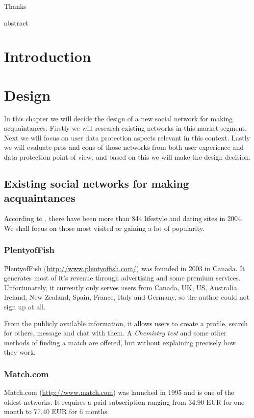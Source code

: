 \documentclass[12pt,oneside]{fithesis}
\begin{document}
\FrontMatter
\ThesisTitlePage

\begin{ThesisDeclaration}
\DeclarationText
\AdvisorName
\end{ThesisDeclaration}

\begin{ThesisThanks}
Thanks
\end{ThesisThanks}

abstract

\MainMatter
\tableofcontents
\chapter*{Introduction}
	
\chapter{Design}
	In this chapter we will decide the design of a new social network for making acquaintances. Firstly we will research existing networks in this market segment. Next we will focus on user data protection aspects relevant in this context. Lastly we will evaluate pros and cons of those networks from both user experience and data protection point of view, and  based on this we will make the design decision. 
\section{Existing social networks for making acquaintances}
	According to \cite{wiki:od}, there have been more than 844 lifestyle and dating sites in 2004. We shall focus on those most visited or gaining a lot of popularity.
	\subsection{PlentyofFish}
		PlentyofFish (\url{http://www.plentyoffish.com/}) was founded in 2003 in Canada. It generates most of it's revenue through advertising and some premium services. Unfortunately, it currently only serves users from Canada, UK, US, Australia, Ireland, New Zealand, Spain, France, Italy and Germany, so the author could not sign up at all.
		
		From the publicly available information, it allows users to create a profile, search for others, message and chat with them. A \emph{Chemistry test} and some other methods of finding a match are offered, but without explaining precisely how they work. \cite{website:pof}
		\subsection{Match.com}
		Match.com (\url{http://www.match.com}) was launched in 1995 and is one of the oldest networks. It requires a paid subscription ranging from 34.90 EUR for one month  to 77.40 EUR for 6 months.
		
\end{document}
